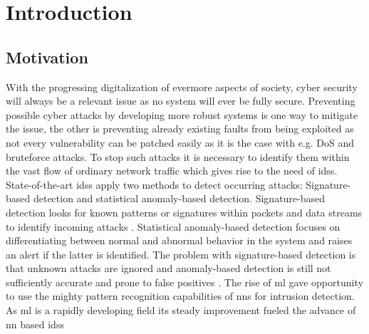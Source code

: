\chapter{Introduction}

\section{Motivation} \label{sect.motivation}

With the progressing digitalization of evermore aspects of society, cyber security will always be a relevant issue as no system will ever be fully secure. Preventing possible cyber attacks by developing more robust systems is one way to mitigate the issue, the other is preventing already existing faults from being exploited as not every vulnerability can be patched easily as it is the case with e.g. DoS and bruteforce attacks. To stop such attacks it is necessary to identify them within the vast flow of ordinary network traffic which gives rise to the need of \glspl{ids}. State-of-the-art \glspl{ids} apply two methods to detect occurring attacks: Signature-based detection and statistical anomaly-based detection. Signature-based detection looks for known patterns or signatures within packets and data streams to identify incoming attacks . Statistical anomaly-based detection focuses on differentiating between normal and abnormal behavior in the system and raises an alert if the latter is identified. The problem with signature-based detection is that unknown attacks are ignored and anomaly-based detection is still not sufficiently accurate and prone to false positives . The rise of \gls{ml} gave opportunity to use the mighty pattern recognition capabilities of \glspl{nn} for intrusion detection. As \gls{ml} is a rapidly developing field its steady improvement fueled the advance of \gls{nn} based \glspl{ids} 
